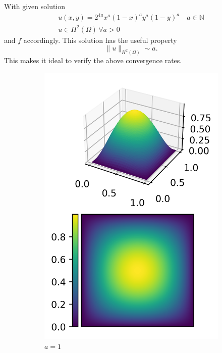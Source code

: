 \documentclass[11pt,a4paper]{article}
\begin{document}
\begin{multicols}{2}
With given solution
\begin{multline*}
  u(x,y) = 2^{4a} x^a (1-x)^a y^a (1-y)^a \quad a \in \mathbb{N}\\
  u \in H^2(\Omega)\,\forall a > 0
\end{multline*}
and $f$ accordingly.
This solution has the useful property
$$\lVert u \rVert_{H^2(\Omega)} \sim a.$$
This makes it ideal to verify the above convergence rates.

\begin{figure}[H]
  \centering
  \begin{subfigure}{.5\linewidth}
    \centering
    \includegraphics[width=.9\linewidth]{contour_1}
    \caption{$a = 1$}
  \end{subfigure}%
  \begin{subfigure}{.5\linewidth}
    \centering

\end{subfigure}
\end{figure}
\end{multicols}
\end{document}
